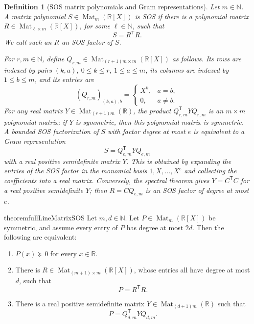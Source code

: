 \documentclass[uplatex,dvipdfmx]{jsarticle}
\newcommand{\Poly}{\mathbb{R}[X]}
\newcommand{\Mat}{\operatorname{Mat}}
\newcommand{\psd}{\succeq 0}
\theoremstyle{matrixsosdefinition}
\newtheorem{definition}[theorem]{Definition}
\begin{document}
\begin{definition}[SOS matrix polynomials and Gram representations]\label{def:sos-gram-en}
  Let \(m\in\mathbb{N}\).
  A matrix polynomial \(S\in\Mat_m(\Poly)\) is SOS if there is a polynomial
  matrix \(R\in\Mat_{\ell\times m}(\Poly)\), for some \(\ell\in\mathbb{N}\),
  such that
	  \[
	    S=R^{\mathsf T}R.
	  \]
	  We call such an \(R\) an SOS factor of \(S\).

	  For \(r,m\in\mathbb{N}\), define
	  \(Q_{r,m}\in\Mat_{(r+1)m\times m}(\Poly)\) as follows.  Its rows are
	  indexed by pairs \((k,a)\), \(0\le k\le r,\ 1\le a\le m\), its columns are
	  indexed by \(1\le b\le m\), and its entries are
  \[
    (Q_{r,m})_{(k,a),b}=
    \begin{cases}
      X^k, & a=b,\\
	      0, & a\ne b.
	    \end{cases}
	  \]
	  For any real matrix \(Y\in\Mat_{(r+1)m}(\mathbb{R})\), the product
	  \(Q_{r,m}^{\mathsf T}YQ_{r,m}\) is an \(m\times m\) polynomial matrix; if
	  \(Y\) is symmetric, then this polynomial matrix is symmetric.
	  A bounded SOS factorization of \(S\) with factor degree at most \(e\) is
	  equivalent to a Gram representation
  \[
    S=Q_{e,m}^{\mathsf T}YQ_{e,m}
  \]
	  with a real positive semidefinite matrix \(Y\).  This is obtained by expanding
  the entries of the SOS factor in the monomial basis \(1,X,\ldots,X^e\) and
  collecting the coefficients into a real matrix.  Conversely, the spectral
  theorem gives \(Y=C^{\mathsf T}C\) for a real positive semidefinite \(Y\);
  then \(R=CQ_{e,m}\) is an SOS factor of degree at most \(e\).
\end{definition}

\begin{restatable}{theorem}{fullLineMatrixSOS}
  Let \(m,d\in\mathbb{N}\). Let \(P\in\Mat_m(\Poly)\) be symmetric, and assume
  every entry of \(P\) has degree at most \(2d\). Then the following are
  equivalent:
  \begin{enumerate}[label=(\arabic*)]
    \item \(P(x)\psd\) for every \(x\in\mathbb{R}\).
    \item There is \(R\in\Mat_{(m+1)\times m}(\Poly)\), whose entries all have
      degree at most \(d\), such that
      \[
        P=R^{\mathsf T}R.
      \]
    \item There is a real positive semidefinite matrix
      \(Y\in\Mat_{(d+1)m}(\mathbb{R})\) such that
      \[
        P=Q_{d,m}^{\mathsf T}YQ_{d,m}.
      \]
  \end{enumerate}
\end{restatable}
\end{document}
